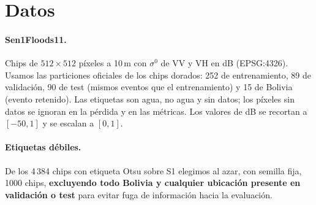 \documentclass{article}
\begin{document}
\section{Datos}

\paragraph{Sen1Floods11.} Chips de $512\times512$ píxeles a 10\,m con $\sigma^0$ de VV y VH en dB
(EPSG:4326). Usamos las particiones oficiales de los chips dorados: 252 de entrenamiento, 89 de
validación, 90 de test (mismos eventos que el entrenamiento) y 15 de Bolivia (evento retenido). Las
etiquetas son agua, no agua y sin datos; los píxeles sin datos se ignoran en la pérdida y en las
métricas. Los valores de dB se recortan a $[-50, 1]$ y se escalan a $[0, 1]$.

\paragraph{Etiquetas débiles.} De los 4\,384 chips con etiqueta Otsu sobre S1 elegimos al azar, con
semilla fija, 1000 chips, \textbf{excluyendo todo Bolivia y cualquier ubicación presente en validación o
test} para evitar fuga de información hacia la evaluación.
\end{document}
